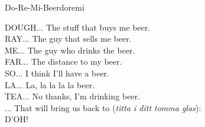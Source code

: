 \begin{song}{Do-Re-Mi-Beer}{doremi}
\begin{vers}
DOUGH... The stuff that buys me beer.\\
RAY... The guy that sells me beer.\\
ME... The guy who drinks the beer.\\
FAR... The distance to my beer.\\
SO... I think I'll have a beer.\\
LA... La, la la la la beer.\\
TEA... No thanks, I'm drinking beer.\\
... That will bring us back to (\textit{titta i ditt tomma glas}):\\
D'OH! \\
\end{vers}
\end{song}
